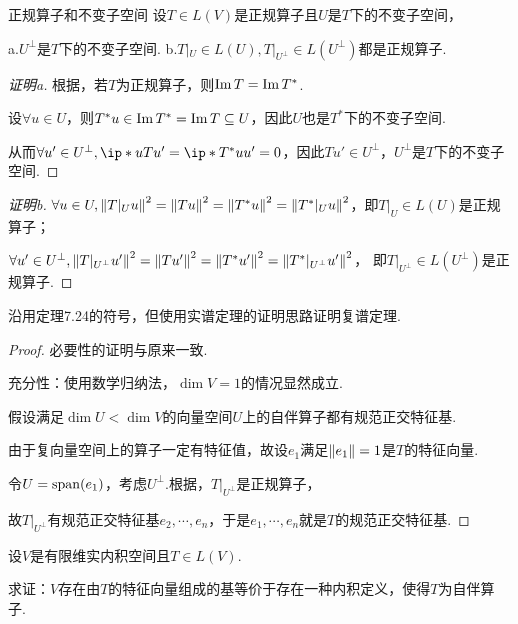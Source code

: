 \newpage

\begin{problem}[20*]\label{7.B.20*} 正规算子和不变子空间 \:
    设\(T \in L(V)\)是正规算子且\(U\)是\(T\)下的不变子空间，

    a.\(U^\bot\)是\(T\)下的不变子空间. \quad
    b.\(T|_U \in L(U),T|_{U^\bot} \in L(U^\bot)\)都是正规算子.
\end{problem}

\begin{proof}[证明a]
    根据，若\(T\)为正规算子，则\(\Img T=\Img T^*\).

    设\(\forall u \in U\)，则\(T^*u \in \Img T^*=\Img T \subseteq U\)，因此\(U\)也是\(T^*\)下的不变子空间.
    
    从而\(\forall u' \in U^\bot,\ip*{u}{Tu'}=\ip*{T^*u}{u'}=0\)，因此\(Tu' \in U^\bot\)，\(U^\bot\)是\(T\)下的不变子空间.
\end{proof}

\begin{proof}[证明b]
    \(\forall u \in U,\norm*{T|_U u}^2=\norm*{Tu}^2=\norm*{T^*u}^2=\norm*{T^*|_U u}^2\)，即\(T|_U \in L(U)\)是正规算子；

    \(\forall u' \in U^\bot,\norm*{T|_{U^\bot}u'}^2=\norm*{Tu'}^2=\norm*{T^*u'}^2=\norm*{T^*|_{U^\bot}u'}^2\)，
    即\(T|_{U^\bot} \in L(U^\bot)\)是正规算子.
\end{proof}

\begin{problem}[13]\label{7.B.13}
    沿用定理7.24的符号，但使用实谱定理的证明思路证明复谱定理.
\end{problem}

\begin{proof}
    必要性的证明与原来一致.

    充分性：使用数学归纳法，\(\dim V=1\)的情况显然成立.
    
    假设满足\(\dim U<\dim V\)的向量空间\(U\)上的自伴算子都有规范正交特征基.
    
    由于复向量空间上的算子一定有特征值，故设\(e_1\)满足\(\norm*{e_1}=1\)是\(T\)的特征向量.
    
    令\(U=\altspan(e_1)\)，考虑\(U^\bot\).根据，\(T|_{U^\bot}\)是正规算子，
    
    故\(T|_{U^\bot}\)有规范正交特征基\(e_2,\cdots,e_n\)，于是\(e_1,\cdots,e_n\)就是\(T\)的规范正交特征基.
\end{proof}

\begin{problem}[14]\label{7.B.14}
    设\(V\)是有限维实内积空间且\(T \in L(V)\).

    求证：\(V\)存在由\(T\)的特征向量组成的基等价于存在一种内积定义，使得\(T\)为自伴算子.
\end{problem}

